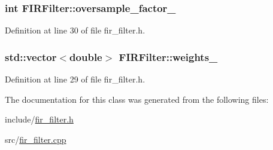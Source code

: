 \subsubsection[{oversample\+\_\+factor\+\_\+}]{\setlength{\rightskip}{0pt plus 5cm}int F\+I\+R\+Filter\+::oversample\+\_\+factor\+\_\+\hspace{0.3cm}{\ttfamily [protected]}}\label{class_f_i_r_filter_aeafbfb79d318c87385f37b906d214a2f}


Definition at line 30 of file fir\+\_\+filter.\+h.

\hypertarget{class_f_i_r_filter_a46bf99ae4424b44d144e7af652e93847}{}
\subsubsection[{weights\+\_\+}]{\setlength{\rightskip}{0pt plus 5cm}std\+::vector$<$double$>$ F\+I\+R\+Filter\+::weights\+\_\+\hspace{0.3cm}{\ttfamily [protected]}}\label{class_f_i_r_filter_a46bf99ae4424b44d144e7af652e93847}


Definition at line 29 of file fir\+\_\+filter.\+h.



The documentation for this class was generated from the following files\+:\begin{DoxyCompactItemize}
\item 
include/\hyperlink{fir__filter_8h}{fir\+\_\+filter.\+h}\item 
src/\hyperlink{fir__filter_8cpp}{fir\+\_\+filter.\+cpp}\end{DoxyCompactItemize}
